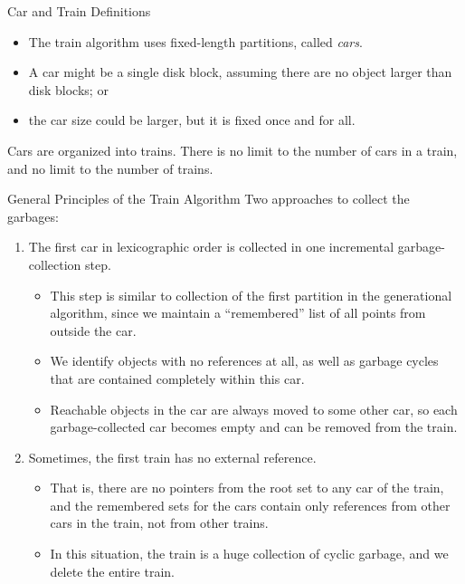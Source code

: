 \begin{bibunit}[apalike]
\begin{frame}{Car and Train Definitions}
	\begin{itemize}
	\item The train algorithm uses fixed-length partitions, called \emph{cars}.
	\end{itemize}
	\begin{definition}[Car]
		\begin{itemize}
		\item A car might be a single disk block, assuming there are no object larger than disk blocks; or
		\item the car size could be larger, but it is fixed once and for all.
		\end{itemize}
	\end{definition}
	\begin{definition}[Train]
		Cars are organized into trains. There is no limit to the number of cars in a train, and no limit to the number of trains.
	\end{definition}
\end{frame}

\begin{frame}{General Principles of the Train Algorithm}
	Two approaches to collect the garbages:
	\begin{enumerate}
	\item<1> The first car in lexicographic order is collected in one incremental garbage-collection step. \begin{itemize}
		\item This step is similar to collection of the first partition in the generational algorithm, since we maintain a ``remembered'' list of all points from outside the car.
		\item We identify objects with no references at all, as well as garbage cycles that are contained completely within this car.
		\item Reachable objects in the car are always moved to some other car, so each garbage-collected car becomes empty and can be removed from the train.
		\end{itemize}
	\item<2> Sometimes, the first train has no external reference. \begin{itemize}
		\item That is, there are no pointers from the root set to any car of the train, and the remembered sets for the cars contain only references from other cars in the train, not from other trains.
		\item In this situation, the train is a huge collection of cyclic garbage, and we delete the entire train.	
		\end{itemize}
	\end{enumerate}
\end{frame}


\end{bibunit}
